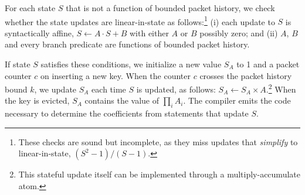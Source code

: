  For each state $S$ that is not
a function of bounded packet history, we check whether the state updates are
linear-in-state as follows:\footnote{These checks are sound
  but incomplete, as they miss updates that {\em simplify} to linear-in-state,
  \eg $(S^2-1)/(S-1)$.} (i) each update to $S$ is syntactically affine, \ie $S
\gets A \cdot S + B$ with either $A$ or $B$ possibly zero; and (ii) $A$, $B$ and
every branch predicate are functions of bounded packet history.



If state $S$ satisfies these conditions, we initialize a new value $S_A$ to 1
and a packet counter $c$ on inserting a new key. When the counter $c$ crosses
the packet history bound $k$, we update $S_A$ each time $S$ is updated, as
follows: $S_A \gets S_A \times A$.\footnote{This stateful update itself can be
  implemented through a multiply-accumulate atom.} When the key is evicted,
$S_A$ contains the value of $\prod_i A_i$. The \TheSystem compiler emits the
code necessary to determine the coefficients from \TheSystem statements that
update $S$.

